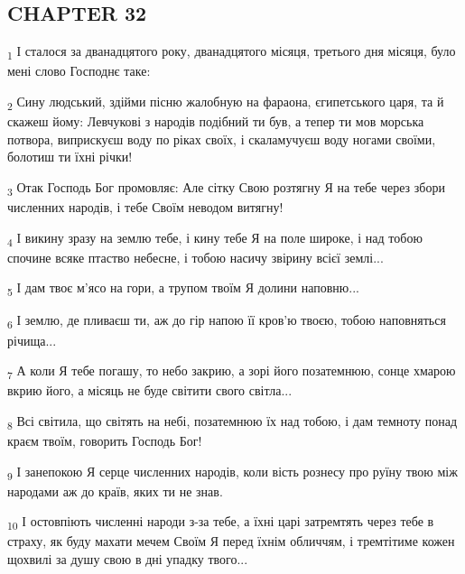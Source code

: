\subsection{CHAPTER 32}
\begin{tcolorbox}
\textsubscript{1} І сталося за дванадцятого року, дванадцятого місяця, третього дня місяця, було мені слово Господнє таке:
\end{tcolorbox}
\begin{tcolorbox}
\textsubscript{2} Сину людський, здійми пісню жалобную на фараона, єгипетського царя, та й скажеш йому: Левчукові з народів подібний ти був, а тепер ти мов морська потвора, виприскуєш воду по ріках своїх, і скаламучуєш воду ногами своїми, болотиш ти їхні річки!
\end{tcolorbox}
\begin{tcolorbox}
\textsubscript{3} Отак Господь Бог промовляє: Але сітку Свою розтягну Я на тебе через збори численних народів, і тебе Своїм неводом витягну!
\end{tcolorbox}
\begin{tcolorbox}
\textsubscript{4} І викину зразу на землю тебе, і кину тебе Я на поле широке, і над тобою спочине всяке птаство небесне, і тобою насичу звірину всієї землі...
\end{tcolorbox}
\begin{tcolorbox}
\textsubscript{5} І дам твоє м'ясо на гори, а трупом твоїм Я долини наповню...
\end{tcolorbox}
\begin{tcolorbox}
\textsubscript{6} І землю, де пливаєш ти, аж до гір напою її кров'ю твоєю, тобою наповняться річища...
\end{tcolorbox}
\begin{tcolorbox}
\textsubscript{7} А коли Я тебе погашу, то небо закрию, а зорі його позатемнюю, сонце хмарою вкрию його, а місяць не буде світити свого світла...
\end{tcolorbox}
\begin{tcolorbox}
\textsubscript{8} Всі світила, що світять на небі, позатемнюю їх над тобою, і дам темноту понад краєм твоїм, говорить Господь Бог!
\end{tcolorbox}
\begin{tcolorbox}
\textsubscript{9} І занепокою Я серце численних народів, коли вість рознесу про руїну твою між народами аж до країв, яких ти не знав.
\end{tcolorbox}
\begin{tcolorbox}
\textsubscript{10} І остовпіють численні народи з-за тебе, а їхні царі затремтять через тебе в страху, як буду махати мечем Своїм Я перед їхнім обличчям, і тремтітиме кожен щохвилі за душу свою в дні упадку твого...
\end{tcolorbox}
